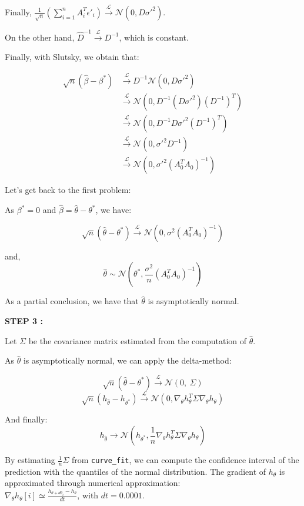 Finally, $\frac{1}{\sqrt{n}} \left(\sum_{i=1}^{n}  A_i^T \epsilon'_i \right) \xrightarrow{\mathcal{L}} \mathcal{N}(0, D \sigma'^{2})$. 

On the other hand, $\hat{D}^{-1} \xrightarrow{\mathcal{L}} D^{-1} $, which is constant.

Finally, with Slutsky, we obtain that: 

\begin{align*}
    \sqrt{n} (\hat{\beta} - \beta^*) &\xrightarrow{\mathcal{L}} D^{-1}\mathcal{N}(0, D \sigma'^2) \\
    &\xrightarrow{\mathcal{L}} \mathcal{N}(0, D^{-1} (D \sigma'^2) (D^{-1})^T) \\
    &\xrightarrow{\mathcal{L}} \mathcal{N}(0, D^{-1} D \sigma'^2 (D^{-1})^{T}) \\
    &\xrightarrow{\mathcal{L}} \mathcal{N}(0, \sigma'^2 D^{-1}) \\
    &\xrightarrow{\mathcal{L}} \mathcal{N}(0, \sigma'^2 (A_0^T A_0)^{-1})
\end{align*}


Let's get back to the first problem: 

As $\beta ^* = 0 $ and $\hat{\beta} = \hat{\theta} - \theta ^* $, we have: 

\[
\sqrt{n} (\hat{\theta} - \theta^*) \xrightarrow{\mathcal{L}} \mathcal{N}(0, \sigma^2 (A_0^T A_0)^{-1})
\]

and, 
\[
\hat{\theta} \sim \mathcal{N}(\theta^*, \frac{\sigma^2}{n} (A_0^T A_0)^{-1})
\]

As a partial conclusion, we have that $\hat{\theta}$ is asymptotically normal.



\textbf{STEP 3 :}\\
\label{step:step3}


Let $\Sigma$ be the covariance matrix estimated from the computation of $\hat{\theta}$. 

As $\hat{\theta}$ is asymptotically normal, we can apply the delta-method: 

\[
\sqrt{n} (\hat{\theta} -\theta^*) \xrightarrow{\mathcal{L}} \mathcal{N}(0, \ \Sigma)
\]
\[
\sqrt{n} (h_{\hat{\theta}} -h_{\theta^*}) \xrightarrow{\mathcal{L}} \mathcal{N}(0, \nabla_\theta h_\theta ^T \Sigma  \nabla_\theta h_\theta)
\]

And finally: 
\[
h_{\hat{\theta}} \rightarrow \mathcal{N}(h_{\theta^*}, \frac{1}{n}\nabla_\theta h_\theta ^T \Sigma  \nabla_\theta h_\theta)
\]

By estimating $\frac{1}{n} \Sigma$ from \texttt{curve\_fit}, we can compute the confidence interval of the prediction with the quantiles of the normal distribution.
The gradient of $h_\theta$ is approximated through numerical approximation: \\
$\nabla_\theta h_\theta [i] \simeq \frac{h_{\theta + d \theta _ i  } - h_\theta}{dt}$, with $dt=0.0001$. \\

